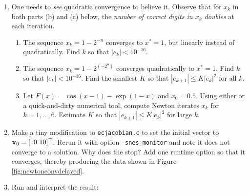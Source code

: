 \renewcommand{\labelenumi}{\arabic{chapter}.\arabic{enumi}\quad}
\renewcommand{\labelenumii}{(\alph{enumii})}
\begin{enumerate}
\item One needs to \emph{see} quadratic convergence to believe it.  Observe that for $x_k$ in both parts (b) and (c) below, the \emph{number of correct digits in $x_k$ doubles} at each iteration.
    \begin{enumerate}
    \item The sequence $x_k = 1-2^{-n}$ converges to $x^*=1$, but linearly instead of quadratically.  Find $k$ so that $|e_k| < 10^{-16}$.
    \item The sequence $x_k = 1-2^{(-2^n)}$ converges quadratically to $x^*=1$.  Find $k$ so that $|e_k| < 10^{-16}$.  Find the smallest $K$ so that $|e_{k+1}| \le K |e_k|^2$ for all $k$.
    \item Let $F(x) = \cos(x-1) - \exp(1-x)$ and $x_0=0.5$.  Using either \PETSc or a quick-and-dirty numerical tool, compute Newton iterates $x_k$ for $k=1,\dots,6$.  Estimate $K$ so that $|e_{k+1}| \le K |e_k|^2$ for large $k$.
    \end{enumerate}

\item Make a tiny modification to \texttt{ecjacobian.c} to set the initial vector to $\mathbf{x}_0 = [10\,\, 10]^\top$.  Rerun it with option \texttt{-snes\_monitor} and note it does not converge to a solution.  Why does the \pSNES stop?  Add one runtime option so that it converges, thereby producing the data shown in Figure \ref{fig:newtonconvdelayed}.

\item \label{exer:nl:snestestdisplay}  Run and interpret the result:


\end{enumerate}
